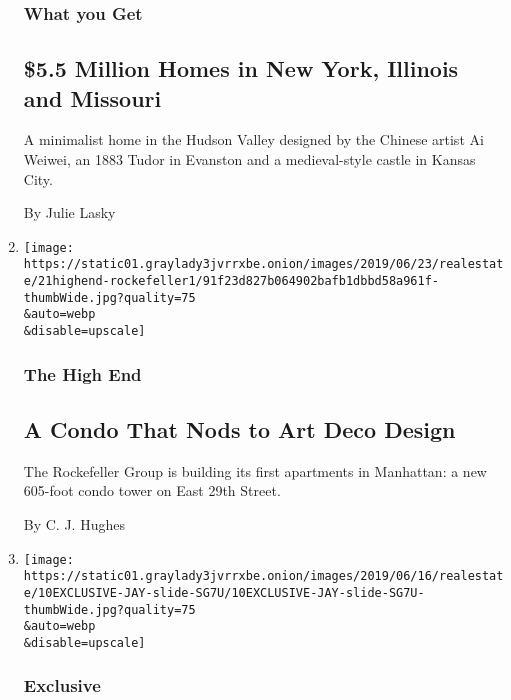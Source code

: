 \begin{enumerate}
  \hypertarget{what-you-get}{%
  \subsubsection{What you Get}\label{what-you-get}}

  \hypertarget{55-million-homes-in-new-york-illinois-and-missouri}{%
  \subsection{\$5.5 Million Homes in New York, Illinois and
  Missouri}\label{55-million-homes-in-new-york-illinois-and-missouri}}

  A minimalist home in the Hudson Valley designed by the Chinese artist
  Ai Weiwei, an 1883 Tudor in Evanston and a medieval-style castle in
  Kansas City.

  By Julie Lasky
\item
  \href{/2019/06/21/realestate/a-condo-that-nods-to-art-deco-design.html}{}

  \texttt{[image: https://static01.graylady3jvrrxbe.onion/images/2019/06/23/realestate/21highend-rockefeller1/91f23d827b064902bafb1dbbd58a961f-thumbWide.jpg?quality=75\\\&auto=webp\\\&disable=upscale]}

  \hypertarget{the-high-end-8}{%
  \subsubsection{The High End}\label{the-high-end-8}}

  \hypertarget{a-condo-that-nods-to-art-deco-design}{%
  \subsection{A Condo That Nods to Art Deco
  Design}\label{a-condo-that-nods-to-art-deco-design}}

  The Rockefeller Group is building its first apartments in Manhattan: a
  new 605-foot condo tower on East 29th Street.

  By C. J. Hughes
\item
  \href{/2019/06/11/realestate/tribeca-penthouse-that-defies-limitations.html}{}

  \texttt{[image: https://static01.graylady3jvrrxbe.onion/images/2019/06/16/realestate/10EXCLUSIVE-JAY-slide-SG7U/10EXCLUSIVE-JAY-slide-SG7U-thumbWide.jpg?quality=75\\\&auto=webp\\\&disable=upscale]}

  \hypertarget{exclusive}{%
  \subsubsection{Exclusive}\label{exclusive}}


\end{enumerate}
